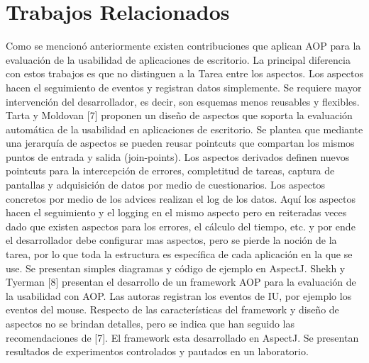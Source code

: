 \section{Trabajos Relacionados}
\label{sec:trabajos_relacionados}
Como se mencionó anteriormente existen contribuciones que aplican AOP para la evaluación de la usabilidad de aplicaciones de escritorio. La principal diferencia con estos trabajos es que no distinguen a la Tarea entre los aspectos. Los aspectos hacen el seguimiento de eventos y registran datos simplemente. Se requiere mayor intervención del desarrollador, es decir, son esquemas menos reusables y flexibles.
Tarta y Moldovan [7] proponen un diseño de aspectos que soporta la evaluación automática de la usabilidad en aplicaciones de escritorio. Se plantea que mediante una jerarquía de aspectos se pueden reusar pointcuts que compartan los mismos puntos de entrada y salida (join-points). Los aspectos derivados definen nuevos pointcuts para la intercepción de errores, completitud de tareas, captura de pantallas y adquisición de datos por medio de cuestionarios. Los aspectos concretos por medio de los advices realizan el log de los datos. Aquí los aspectos hacen el seguimiento y el logging en el mismo aspecto pero en reiteradas veces dado que existen aspectos para los errores, el cálculo del tiempo, etc. y por ende el desarrollador debe configurar mas aspectos, pero se pierde la noción de la tarea, por lo que toda la estructura es específica de cada aplicación en la que se use. Se presentan simples diagramas y código de ejemplo en AspectJ.
Shekh y Tyerman [8] presentan el desarrollo de un framework AOP para la evaluación de la usabilidad con AOP. Las autoras registran los eventos de IU, por ejemplo los eventos del mouse. Respecto de las características del framework y diseño de aspectos no se brindan detalles, pero se indica que han seguido las recomendaciones de [7]. El framework esta desarrollado en AspectJ. Se presentan resultados de experimentos controlados y pautados en un laboratorio.

